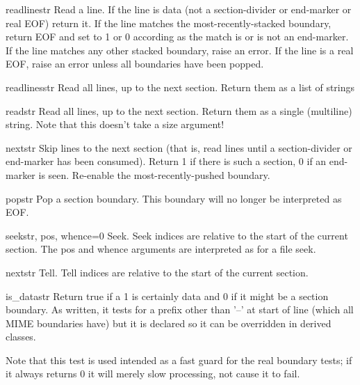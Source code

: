 \begin{methoddesc}{readline}{str}
Read a line.  If the line is data (not a section-divider or end-marker
or real EOF) return it.  If the line matches the most-recently-stacked
boundary, return EOF and set  to 1 or 0 according as
the match is or is not an end-marker.  If the line matches any other
stacked boundary, raise an error.  If the line is a real EOF, raise an
error unless all boundaries have been popped.
\end{methoddesc}

\begin{methoddesc}{readlines}{str}
Read all lines, up to the next section.  Return them as a list of strings
\end{methoddesc}

\begin{methoddesc}{read}{str}
Read all lines, up to the next section.  Return them as a single
(multiline) string.  Note that this doesn't take a size argument!
\end{methoddesc}

\begin{methoddesc}{next}{str}
Skip lines to the next section (that is, read lines until a
section-divider or end-marker has been consumed).  Return 1 if there
is such a section, 0 if an end-marker is seen.  Re-enable the
most-recently-pushed boundary.
\end{methoddesc}

\begin{methoddesc}{pop}{str}
Pop a section boundary.  This boundary will no longer be interpreted as EOF.
\end{methoddesc}

\begin{methoddesc}{seek}{str, pos, whence=0}
Seek.  Seek indices are relative to the start of the current section.
The pos and whence arguments are interpreted as for a file seek.
\end{methoddesc}

\begin{methoddesc}{next}{str}
Tell.  Tell indices are relative to the start of the current section.
\end{methoddesc}

\begin{methoddesc}{is_data}{str}
Return true if a 1 is certainly data and 0 if it might be a section
boundary.  As written, it tests for a prefix other than '--' at start of
line (which all MIME boundaries have) but it is declared so it can be
overridden in derived classes.

Note that this test is used intended as a fast guard for the real
boundary tests; if it always returns 0 it will merely slow processing,
not cause it to fail.
\end{methoddesc}

